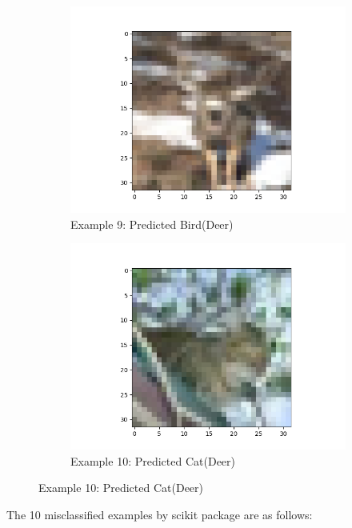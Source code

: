 \documentclass[11pt]{article}
\begin{document}
\begin{figure}[H]
\begin{subfigure}[b]{0.3\textwidth}
        \includegraphics[width=\linewidth]{misA9.png}
        \caption{Example 9: Predicted Bird(Deer)}
    \end{subfigure}
    \hfill
    \begin{subfigure}[b]{0.3\textwidth}
        \centering
        \includegraphics[width=\linewidth]{misA10.png}
        \caption{Example 10: Predicted Cat(Deer)}
    \end{subfigure} 
\end{figure}
\newpage
The 10 misclassified examples by scikit package are as follows:
\end{document}
